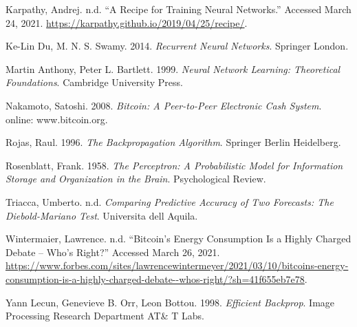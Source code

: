 \documentclass[
]{article}
\newlength{\cslhangindent}
\newenvironment{cslreferences}%
  {\setlength{\parindent}{0pt}%
  \everypar{\setlength{\hangindent}{\cslhangindent}}\ignorespaces}%
  {\par}
\begin{document}
\begin{cslreferences}
\leavevmode\hypertarget{ref-recipe_training}{}%
Karpathy, Andrej. n.d. ``A Recipe for Training Neural Networks.''
Accessed March 24, 2021.
\url{https://karpathy.github.io/2019/04/25/recipe/}.

\leavevmode\hypertarget{ref-RNN}{}%
Ke-Lin Du, M. N. S. Swamy. 2014. \emph{Recurrent Neural Networks}.
Springer London.

\leavevmode\hypertarget{ref-nn_learning_theoretical_foundations}{}%
Martin Anthony, Peter L. Bartlett. 1999. \emph{Neural Network Learning:
Theoretical Foundations}. Cambridge University Press.

\leavevmode\hypertarget{ref-bitcoin}{}%
Nakamoto, Satoshi. 2008. \emph{Bitcoin: A Peer-to-Peer Electronic Cash
System}. online: www.bitcoin.org.

\leavevmode\hypertarget{ref-backpropagation}{}%
Rojas, Raul. 1996. \emph{The Backpropagation Algorithm}. Springer Berlin
Heidelberg.

\leavevmode\hypertarget{ref-perceptron_paper}{}%
Rosenblatt, Frank. 1958. \emph{The Perceptron: A Probabilistic Model for
Information Storage and Organization in the Brain}. Psychological
Review.

\leavevmode\hypertarget{ref-DM_lecture}{}%
Triacca, Umberto. n.d. \emph{Comparing Predictive Accuracy of Two
Forecasts: The Diebold-Mariano Test}. Universita dell Aquila.

\leavevmode\hypertarget{ref-energy_consumption}{}%
Wintermaier, Lawrence. n.d. ``Bitcoin's Energy Consumption Is a Highly
Charged Debate -- Who's Right?'' Accessed March 26, 2021.
\url{https://www.forbes.com/sites/lawrencewintermeyer/2021/03/10/bitcoins-energy-consumption-is-a-highly-charged-debate--whos-right/?sh=41f655eb7e78}.

\leavevmode\hypertarget{ref-efficient_backprop}{}%
Yann Lecun, Genevieve B. Orr, Leon Bottou. 1998. \emph{Efficient
Backprop}. Image Processing Research Department AT\& T Labs.
\end{cslreferences}
\end{document}
